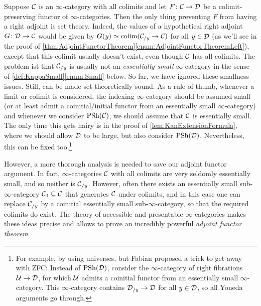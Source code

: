 \newpage


Suppose $\mathcal{C}$ is an $\infty$-category with all colimits and let $F\colon \mathcal{C}\rightarrow\mathcal{D}$ be a colimit-preserving functor of $\infty$-categories. Then the only thing preventing $F$ from having a right adjoint is set theory. Indeed, the values of a hypothetical right adjoint $G\colon \mathcal{D}\rightarrow\mathcal{C}$ would be given by $G(y)\simeq \operatorname*{colim}(\mathcal{C}_{/y}\rightarrow \mathcal{C})$ for all $y\in\mathcal{D}$ (as we'll see in the proof of \cref{thm:AdjointFunctorTheorem}\cref{enum:AdjointFunctorTheoremLeft}), except that this colimit usually doesn't exist, even though $\mathcal{C}$ has all colimits. The problem ist that $\mathcal{C}_{/y}$ is usually not an \emph{essentially small} $\infty$-category in the sense of \cref{def:KappaSmall}\cref{enum:Small} below. So far, we have ignored these smallness issues. Still,  can be made set-theoretically sound. As a rule of thumb, whenever a limit or colimit is considered, the indexing $\infty$-category should be assumed small (or at least admit a coinitial/initial functor from an essentially small $\infty$-category) and whenever we consider $\operatorname{PSh}(\mathcal{C})$, we should assume that $\mathcal{C}$ is essentially small. The only time this gets hairy is in the proof of \cref{lem:KanExtensionFormula}, where we should allow $\mathcal{D}$ to be large, but also consider $\operatorname{PSh}(\mathcal{D})$. Nevertheless, this can be fixed too.\footnote{For example, by using universes, but Fabian proposed a trick to get away with ZFC: Instead of $\operatorname{PSh}(\mathcal{D})$, consider the $\infty$-category of right fibrations $\mathcal{U}\rightarrow \mathcal{D}$, for which $\mathcal{U}$ admits a coinitial functor from an essentially small $\infty$-category. This $\infty$-category contains $\mathcal{D}_{/y}\rightarrow\mathcal{D}$ for all $y\in \mathcal{D}$, so all Yoneda arguments go through.}

However, a more thorough analysis is needed to save our adjoint functor argument. In fact, $\infty$-categories $\mathcal{C}$ with all colimits are very seldomly essentially small, and so neither is $\mathcal{C}_{/y}$. However, often there exists an essentially small sub-$\infty$-category $\mathcal{C}_0\subseteq\mathcal{C}$ that generates $\mathcal{C}$ under colimits, and in this case one can replace $\mathcal{C}_{/y}$ by a coinitial essentially small sub-$\infty$-category, so that the required colimits do exist. The theory of accessible and presentable $\infty$-categories makes these ideas precise and allows to prove an incredibly powerful \emph{adjoint functor theorem}.

